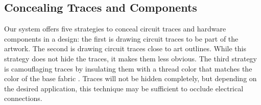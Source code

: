 \documentclass[header.tex]{subfiles}
\begin{document}



 

\subsection{Concealing Traces and Components}
Our system offers five strategies to conceal circuit traces and hardware components in a design: the first is drawing circuit traces to be part of the artwork. The second is drawing circuit traces close to art outlines. 
While this strategy does not hide the traces, it makes them less obvious. 
The third strategy is camouflaging traces by insulating them with a thread color that matches the color of the base fabric \cite{Buechley2009}. Traces will not be hidden completely, but depending on the desired application, this technique may be sufficient to occlude electrical connections. 
\end{document}
